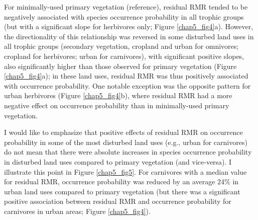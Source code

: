\clearpage

For minimally-used primary vegetation (reference), residual RMR tended to be negatively associated with species occurrence probability in all trophic groups (but with a significant slope for herbivores only; Figure \ref{chap5_fig4}a). However, the directionality of this relationship was reversed in some disturbed land uses in all trophic groups (secondary vegetation, cropland and urban for omnivores; cropland for herbivores; urban for carnivores), with significant positive slopes, also significantly higher than those observed for primary vegetation (Figure \ref{chap5_fig4}a); in these land uses, residual RMR was thus positively associated with occurrence probability. One notable exception was the opposite pattern for urban herbivores (Figure \ref{chap5_fig4}b), where residual RMR had a more negative effect on occurrence probability than in minimally-used primary vegetation.

I would like to emphasize that positive effects of residual RMR on occurrence probability in some of the most disturbed land uses (e.g., urban for carnivores) do not mean that there were absolute increases in species occurrence probability in disturbed land uses compared to primary vegetation (and vice-versa). I illustrate this point in Figure \ref{chap5_fig5}. For carnivores with a median value for residual RMR, occurrence probability was reduced by an average 24\% in urban land uses compared to primary vegetation (but there was a significant positive association between residual RMR and occurrence probability for carnivores in urban areas; Figure \ref{chap5_fig4}). 


